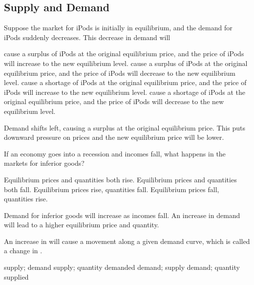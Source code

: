 \documentclass[addpoints,11pt]{exam}
\theoremstyle{definition}
\newcommand{\blank}[0]{\underline{\hspace{3cm}}}
\begin{document}
\newpage

\subsection*{Supply and Demand}

\begin{questions}
		
\question Suppose the market for iPods is initially in equilibrium, and the demand for iPods suddenly decreases. This decrease in demand will

\begin{choices}
	\choice cause a surplus of iPods at the original equilibrium price, and the price of iPods will increase to the new equilibrium level.
	\CorrectChoice cause a surplus of iPods at the original equilibrium price, and the price of iPods will decrease to the new equilibrium level.
	\choice cause a shortage of iPods at the original equilibrium price, and the price of iPods will increase to the new equilibrium level.
	\choice cause a shortage of iPods at the original equilibrium price, and the price of iPods will decrease to the new equilibrium level.
\end{choices}

\begin{solution}
	Demand shifts left, causing a surplus at the original equilibrium price. This puts downward pressure on prices and the new equilibrium price will be lower.
\end{solution}

\question If an economy goes into a recession and incomes fall, what happens in the markets for inferior goods?

\begin{choices}
	\CorrectChoice Equilibrium prices and quantities both rise.
	\choice Equilibrium prices and quantities both fall.
	\choice Equilibrium prices rise, quantities fall.
	\choice Equilibrium prices fall, quantities rise.
\end{choices}

\begin{solution}
	Demand for inferior goods will increase as incomes fall. An increase in demand will lead to a higher equilibrium price and quantity.
\end{solution}



\question An increase in \blank will cause a movement along a given demand curve, which is called a change in \blank.

\begin{choices}
	\choice supply; demand
	\CorrectChoice supply; quantity demanded
	\choice demand; supply
	\choice demand; quantity supplied
\end{choices}


\end{questions}
\end{document}
